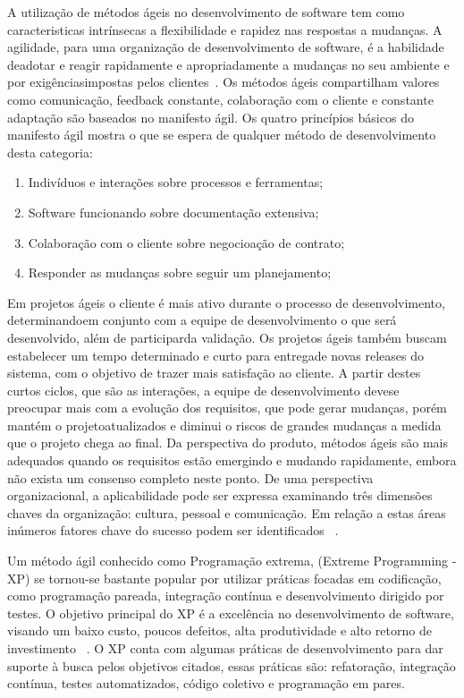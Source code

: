 A utilização de métodos ágeis no desenvolvimento de software tem como caracteristicas 
intrínsecas a flexibilidade e rapidez nas respostas a mudanças. 
%
A agilidade, para uma organização de desenvolvimento de software, é a habilidade 
deadotar e reagir rapidamente e apropriadamente a mudanças no seu ambiente e por 
exigênciasimpostas pelos clientes~\cite{nerur2005}.
%
Os métodos ágeis compartilham valores como comunicação, feedback constante, colaboração 
com o cliente e constante adaptação são baseados no manifesto ágil. Os quatro princípios 
básicos do manifesto ágil mostra o que se espera de qualquer método de desenvolvimento 
desta categoria:
%
\begin{enumerate}
\item Indivíduos  e interações sobre processos e ferramentas;
\item Software funcionando sobre documentação extensiva;
\item Colaboração com o cliente sobre negocioação de contrato;
\item Responder as  mudanças sobre seguir um planejamento;
\end{enumerate}
%
Em projetos ágeis o cliente é mais ativo durante o processo de desenvolvimento, 
determinandoem conjunto com a equipe de desenvolvimento o que será desenvolvido, 
além de participarda validação. Os projetos ágeis também buscam estabelecer um 
tempo determinado e curto para entregade novas releases do sistema, com o objetivo 
de trazer mais satisfação ao cliente.
%
A partir destes curtos ciclos, que são as interações, a equipe de desenvolvimento 
devese preocupar mais com a evolução dos requisitos, que pode gerar mudanças, porém 
mantém o projetoatualizados e diminui o riscos de grandes mudanças a medida que o 
projeto chega ao final.
%
Da perspectiva do produto, métodos ágeis são mais adequados quando os requisitos 
estão emergindo e mudando rapidamente, embora não exista um consenso completo 
neste ponto. De uma perspectiva organizacional, a aplicabilidade pode ser expressa 
examinando três dimensões chaves da organização: cultura, pessoal e comunicação. 
Em relação a estas áreas inúmeros fatores chave do sucesso podem ser identificados 
~\cite{cohen2004}.

Um método ágil conhecido como Programação extrema, (Extreme Programming - XP) se 
tornou-se bastante popular por utilizar práticas focadas em codificação, como 
programação pareada, integração contínua e desenvolvimento dirigido por testes.
%
O objetivo principal do XP é a excelência no desenvolvimento de software, visando 
um baixo custo, poucos defeitos, alta produtividade e alto retorno de investimento
~\cite{sato2007}.
O XP conta com algumas práticas de desenvolvimento para dar suporte à busca pelos 
objetivos citados, essas práticas são: refatoração, integração contínua, testes 
automatizados, código coletivo e programação em pares.





